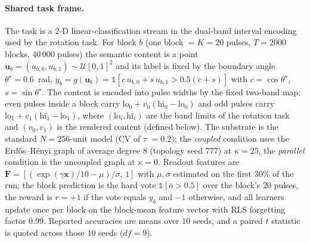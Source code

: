 \documentclass[preprint,12pt]{elsarticle}
\begin{document}
\paragraph{Shared task frame.} The task is a $2$-D linear-classification
stream in the dual-band interval encoding used by the rotation task. For
block $b$ (one block $=K=20$ pulses, $T=2000$ blocks, $40\,000$ pulses) the
semantic content is a point
$\mathbf u_b=(u_{b,0},u_{b,1})\sim\mathcal U[0,1]^2$ and its label is fixed by
the boundary angle $\theta^\star=0.6$~rad,
$y_b=g(\mathbf u_b)=\mathbb 1[c\,u_{b,0}+s\,u_{b,1}>0.5(c+s)]$ with
$c=\cos\theta^\star$, $s=\sin\theta^\star$. The content is encoded into pulse
widths by the fixed two-band map: even pulses inside a block carry
$\mathrm{lo}_0+v_0(\mathrm{hi}_0-\mathrm{lo}_0)$ and odd pulses carry
$\mathrm{lo}_1+v_1(\mathrm{hi}_1-\mathrm{lo}_1)$, where $(\mathrm{lo}_i,
\mathrm{hi}_i)$ are the band limits of the rotation task and $(v_0,v_1)$ is
the rendered content (defined below). The substrate is the standard
$N=256$-unit model (CV of $\tau$ $=0.2$); the \emph{coupled} condition uses
the Erd\H{o}s--R\'enyi graph of average degree $8$ (topology seed $777$) at
$\kappa=25$, the \emph{parallel} condition is the uncoupled graph at
$\kappa=0$. Readout features are
$\mathbf F=[(\exp(\gamma\mathbf x)/10-\mu)/\sigma,\,1]$ with $\mu,\sigma$
estimated on the first $30\%$ of the run; the block prediction is the hard
vote $\mathbb 1[\bar o>0.5]$ over the block's $20$ pulses, the reward is
$r=+1$ if the vote equals $y_b$ and $-1$ otherwise, and all learners update
once per block on the block-mean feature vector with RLS forgetting factor
$0.99$. Reported accuracies are means over $10$ seeds, and a paired $t$
statistic is quoted across those $10$ seeds ($df=9$).
\end{document}
